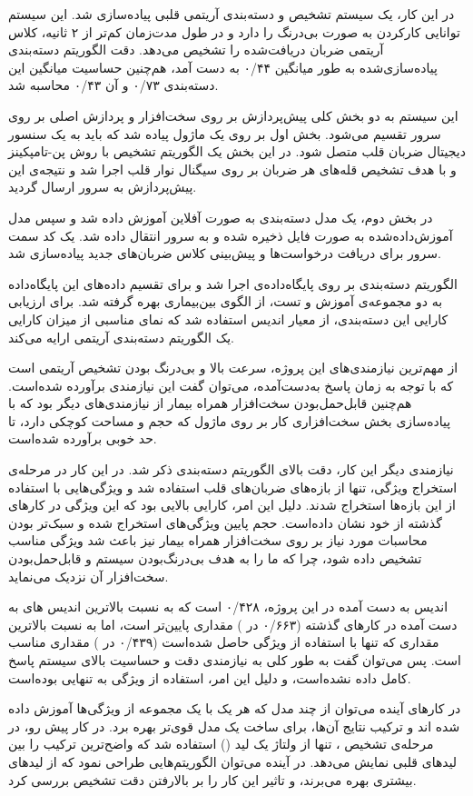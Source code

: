  
\label{chap:conclusion}
\pagebreak
در این کار، یک سیستم تشخیص و دسته‌بندی آریتمی قلبی پیاده‌سازی شد. این سیستم توانایی کارکردن به صورت بی‌درنگ را دارد و در طول مدت‌زمان کم‌تر از ۲ ثانیه، کلاس آریتمی ضربان دریافت‌شده را تشخیص می‌دهد. دقت الگوریتم دسته‌بندی پیاده‌سازی‌شده به طور میانگین ۰/۴۴ به دست آمد، هم‌چنین حساسیت میانگین این دسته‌بندی ۰/۷۳ و   آن ۰/۴۳ محاسبه شد. 

این سیستم به دو بخش کلی پیش‌پردازش بر روی سخت‌افزار و پردازش اصلی بر روی سرور تقسیم می‌شود. بخش اول بر روی یک ماژول  پیاده شد که باید به یک سنسور دیجیتال ضربان قلب متصل شود. در این بخش یک الگوریتم تشخیص  با روش پن-تامپکینز و با هدف تشخیص قله‌های  هر ضربان بر روی سیگنال نوار قلب اجرا شد و نتیجه‌ی این پیش‌پردازش به سرور ارسال گردید.

در بخش دوم، یک مدل دسته‌بندی  به صورت آفلاین آموزش داده شد و سپس مدل آموزش‌داده‌شده به صورت فایل ذخیره شده و به سرور انتقال داده شد. یک کد سمت سرور برای دریافت درخواست‌ها و پیش‌بینی کلاس ضربان‌‌های جدید پیاده‌سازی شد.

الگوریتم دسته‌بندی بر روی پایگاه‌داده‌ی  اجرا شد و برای تقسیم داده‌های این پایگاه‌داده به دو مجموعه‌ی آموزش و تست، از الگوی بین‌بیماری بهره گرفته شد. برای ارزیابی کارایی این دسته‌بندی، از معیار اندیس   استفاده شد که نمای مناسبی از میزان کارایی یک الگوریتم دسته‌بندی آریتمی ارایه می‌کند.

از مهم‌ترین نیازمندی‌های این پروژه، سرعت بالا و بی‌درنگ بودن تشخیص آریتمی است که با توجه به زمان پاسخ به‌دست‌آمده، می‌توان گفت این نیازمندی برآورده شده‌است. هم‌چنین قابل‌حمل‌بودن سخت‌افزار همراه بیمار  از نیازمندی‌های دیگر بود که با پیاده‌سازی بخش سخت‌افزاری کار بر روی ماژول  که حجم و مساحت کوچکی دارد، تا حد خوبی برآورده شده‌است.

نیازمندی دیگر این کار، دقت بالای الگوریتم دسته‌بندی ذکر شد. در این کار در مرحله‌ی استخراج ویژگی، تنها از بازه‌های  ضربان‌های قلب استفاده شد و ویژگی‌هایی با استفاده از این بازه‌ها استخراج شدند. دلیل این امر، کارایی بالایی بود که این ویژگی‌ در کارهای گذشته از خود نشان داده‌است. حجم پایین ویژگی‌های استخراج شده و سبک‌تر بودن محاسبات مورد نیاز بر روی سخت‌افزار همراه بیمار  نیز باعث شد ویژگی  مناسب تشخیص داده شود، چرا که ما را به هدف بی‌درنگ‌بودن سیستم و قابل‌حمل‌بودن سخت‌افزار آن نزدیک می‌نماید.

اندیس   به دست آمده در این پروژه، ۰/۴۲۸ است که به نسبت بالاترین اندیس   های به دست آمده در کارهای گذشته (۰/۶۶۳ در \cite{Mar2011}) مقداری پایین‌تر است، اما به نسبت بالاترین مقداری که تنها با استفاده از ویژگی  حاصل شده‌است (۰/۴۳۹ در \cite{Mondejar}) مقداری مناسب است. پس می‌توان گفت به طور کلی به نیازمندی دقت و حساسیت بالای سیستم پاسخ کامل داده نشده‌است، و دلیل این امر، استفاده از ویژگی  به تنهایی بوده‌است.


در کارهای آینده می‌توان از چند مدل  که هر یک با یک مجموعه از ویژگی‌ها آموزش داده شده اند و ترکیب نتایج آن‌ها، برای ساخت یک مدل  قوی‌تر بهره برد. در کار پیش رو، در مرحله‌ی تشخیص ، تنها از ولتاژ یک لید () استفاده شد که واضح‌ترین ترکیب  را بین لیدهای قلبی نمایش می‌دهد. در آینده می‌توان الگوریتم‌هایی طراحی نمود که از  لیدهای بیشتری بهره می‌برند، و تاثیر این کار را بر بالارفتن دقت تشخیص  بررسی کرد.
